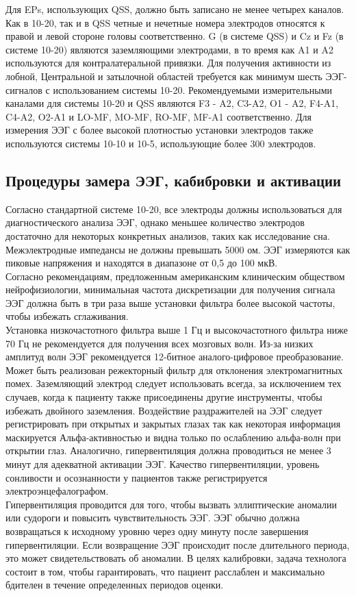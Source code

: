 \documentclass[12pt, a4paper, titlepage]{extreport}
\begin{document}
	Для EPs, использующих QSS, должно быть записано не менее четырех каналов. Как в 10-20, так и в QSS четные и нечетные номера электродов относятся к правой и левой стороне головы соответственно. G (в системе QSS) и Cz и Fz (в системе 10-20) являются заземляющими электродами, в то время как A1 и A2 используются для контралатеральной привязки. Для получения активности из лобной, Центральной и затылочной областей требуется как минимум шесть ЭЭГ-сигналов с использованием системы 10-20. Рекомендуемыми измерительными каналами для системы 10-20 и QSS являются F3 - A2, C3-A2, O1 - A2, F4-A1, C4-A2, O2-A1 и LO-MF, MO-MF, RO-MF, MF-A1 соответственно. Для измерения ЭЭГ с более высокой плотностью установки электродов также используются системы 10-10 и 10-5, использующие более 300 электродов.
	\subsection*{Процедуры замера ЭЭГ, кабибровки и активации}
	Согласно стандартной системе 10-20, все электроды должны использоваться для диагностического анализа ЭЭГ, однако меньшее количество электродов достаточно для некоторых конкретных анализов, таких как исследование сна. Межэлектродные импедансы не должны превышать 5000 ом. ЭЭГ измеряются как пиковые напряжения и находятся в диапазоне от 0,5 до 100 мкВ.\\
	Согласно рекомендациям, предложенным американским клиническим обществом нейрофизиологии, минимальная частота дискретизации для получения сигнала ЭЭГ должна быть в три раза выше установки фильтра более высокой частоты, чтобы избежать сглаживания.\\
	Установка низкочастотного фильтра выше 1 Гц и высокочастотного фильтра ниже 70 Гц не рекомендуется для получения всех мозговых волн. Из-за низких амплитуд волн ЭЭГ рекомендуется 12-битное аналого-цифровое преобразование. Может быть реализован режекторный фильтр для отклонения электромагнитных помех. Заземляющий электрод следует использовать всегда, за исключением тех случаев, когда к пациенту также присоединены другие инструменты, чтобы избежать двойного заземления.
	Воздействие раздражителей на ЭЭГ следует регистрировать при открытых и закрытых глазах так как некоторая информация маскируется Альфа-активностью и видна только по ослаблению альфа-волн при открытии глаз. Аналогично, гипервентиляция должна проводиться не менее 3 минут для адекватной активации ЭЭГ. Качество
	гипервентиляции, уровень сонливости и осознанности у пациентов также регистрируется электроэнцефалографом.\\
	Гипервентиляция проводится для того, чтобы вызвать эллиптические аномалии или судороги и повысить чувствительность ЭЭГ. ЭЭГ обычно должна возвращаться к исходному уровню через одну минуту после завершения гипервентиляции. Если возвращение ЭЭГ происходит после длительного периода, это может свидетельствовать об аномалии. В целях калибровки, задача технолога состоит в том, чтобы гарантировать, что пациент расслаблен и максимально бдителен в течение определенных периодов оценки.
\end{document}
